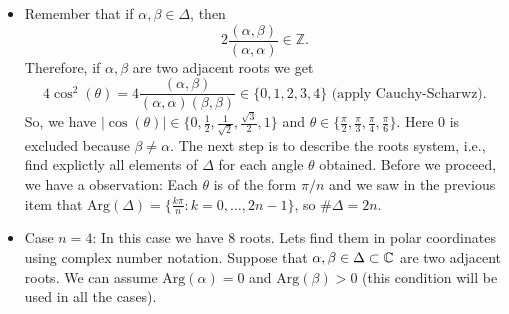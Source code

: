 \begin{itemize}
\begin{equation}
\begin{split}
        &= 2 \cos(\theta) \cos(n\theta) - \cos((n-1)\theta) \\
        &= \cos((n+1)\theta).
        \end{split}
    \end{equation}
   Now let $n=\text{Max}\{k\geq1:n\theta\leq2\pi\}$. If $n\theta<2\pi$, then $2\pi <(n+1)\theta<\theta + 2\pi$, which 
   is a contradiction with the hipothesis that $\theta$ is the smallest angle between two adjacent roots. Therefore, we 
   see that $n\theta=2\pi$ and $\theta=2\pi/n$. Since the only colinear roots are $\{\pm\alpha\}$, we see that we have 
   obtained all roots by this process, because of the condition of minimality of $\theta$.
   
   \item Remember that if $\alpha,\beta\in\Delta$, then 
   \begin{equation}
    2\frac{(\alpha,\beta)}{(\alpha,\alpha)}\in\mathbb{Z}.
   \end{equation}
   Therefore, if $\alpha,\beta$ are two adjacent roots we get 
   \begin{equation}
    4\cos^2(\theta)=4\frac{(\alpha,\beta)}{(\alpha,\alpha)(\beta,\beta)} \in\{0,1,2,3,4\} 
\text{ (apply Cauchy-Scharwz)}.
   \end{equation}
So, we have $|\cos(\theta)|\in\{0,\frac12,\frac{1}{\sqrt{2}},\frac{\sqrt{3}}{2},1\}$ and 
$\theta\in\{\frac{\pi}{2},\frac{\pi}{3},\frac{\pi}{4},\frac{\pi}{6}\}$. Here 0 is excluded because $\beta\neq\alpha$.
The next step is to describe the roots system, i.e., find explictly all elements of $\Delta$ for each angle 
$\theta$ obtained. Before we proceed, we have a observation: Each $\theta$ is of the form $\pi/n$ and we saw in the previous item 
that $\text{Arg}(\Delta)=\{\frac{k\pi}{n}:k=0,\dots,2n-1\}$, so $\#\Delta=2n$. 


\item Case $n=4$: In this case we have 8 roots. Lets find them in polar coordinates using complex number notation.
Suppose that $\alpha,\beta\in \Delta\subset\mathbb{C}$ are two adjacent roots. 
We can assume $\text{Arg}(\alpha)=0$ and $\text{Arg}(\beta)>0$ (this condition will be used in all the cases).\par 


\end{itemize}
